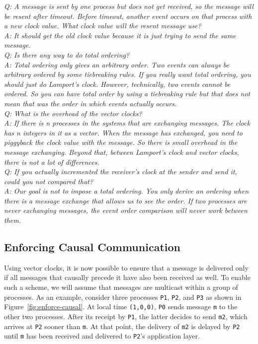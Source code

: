 \documentclass[twoside]{article}
\begin{document}
\textit{Q: A message is sent by one process but does not get received, so the message will be resent after timeout. Before timeout, another event occurs on that process with a new clock value. What clock value will the resent message use? \\
A: It should get the old clock value because it is just trying to send the same message.\\
Q: Is there any way to do total ordering?\\
A: Total ordering only gives an arbitrary order. Two events can always be arbitrary ordered by some tiebreaking rules. If you really want total ordering, you should just do Lamport's clock. However, technically, two events cannot be ordered. So you can have total order by using a tiebreaking rule but that does not mean that was the order in which events actually occurs.\\
Q: What is the overhead of the vector clocks?\\
A: If there is n processes in the systems that are exchanging messages. The clock has n integers in it as a vector. When the message has exchanged, you need to piggyback the clock value with the message. So there is small overhead in the message exchanging. Beyond that, between Lamport's clock and vector clocks, there is not a lot of differences.\\
Q: If you actually incremented the receiver's clock at the sender and send it, could you not compared that?\\
A: Our goal is not to impose a total ordering. You only derive an ordering when there is a message exchange that allows us to see the order. If two processes are never exchanging messages, the event order comparison will never work between them.}

\subsection{Enforcing Causal Communication}

Using vector clocks, it is now possible to ensure that a message is delivered only if all messages that causally precede it have also been received as well. To enable such a scheme, we will assume that messages are multicast within a group of processes. As an example, consider three processes \verb|P1|, \verb|P2|, and \verb|P3| as shown in Figure~\ref{fig:enforce-causal}. At local time \verb|(1,0,0)|, \verb|P0| sends message \verb|m| to the other two processes. After its receipt by \verb|P1|, the latter decides to send \verb|m2|, which arrives at \verb|P2| sooner than \verb|m|. At that point, the delivery of \verb|m2| is delayed by \verb|P2| until \verb|m| has been received and delivered to \verb|P2|'s application layer.
\end{document}
